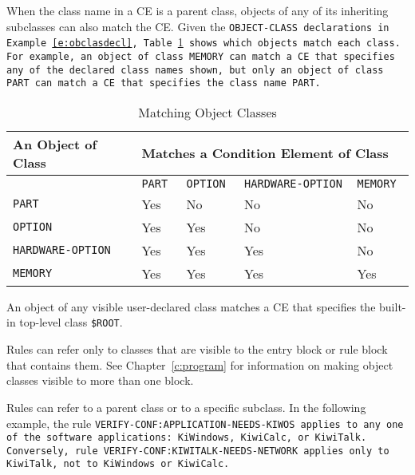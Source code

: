 When the class name in a CE is a parent class, objects of any of its
inheriting subclasses can also match the CE.  Given the
\tt{OBJECT-CLASS} declarations in Example~\ref{e:obclasdecl},
Table~\ref{t:matchingobclass} shows which objects match each
class. For example, an object of class \tt{MEMORY} can match a CE that
specifies any of the declared class names shown, but only an object of
class \tt{PART} can match a CE that specifies the class name
\tt{PART}.

\begin{table}[h]
  \centering
  \begin{tabular}{lllll}
    \toprule
    An Object of Class & \multicolumn{4}{l}{Matches a Condition Element of  Class} \\
    \midrule
    & \tt{PART} & \tt{OPTION} & \tt{HARDWARE-OPTION} & \tt{MEMORY} \\
    \midrule
    \tt{PART}               & Yes  & No     & No       & No  \\
    \tt{OPTION}             & Yes  & Yes    & No       & No  \\
    \tt{HARDWARE-OPTION}    & Yes  & Yes    & Yes      & No  \\
    \tt{MEMORY}             & Yes  & Yes    & Yes      & Yes  \\
    \bottomrule
  \end{tabular}
  \caption{Matching Object Classes}
  \label{t:matchingobclass}
\end{table}

An object of any visible user-declared class matches a CE that
specifies the built-in top-level class \verb|$ROOT|.

Rules can refer only to classes that are visible to the entry block or
rule block that contains them. See Chapter~\ref{c:program} for
information on making object classes visible to more than one block.

Rules can refer to a parent class or to a specific subclass. In
the following example, the rule
\tt{VERIFY-CONF:APPLICATION-NEEDS-KIWOS} applies to any one
of the software applications: \tt{KiWindows}, \tt{KiwiCalc}, or
\tt{KiwiTalk}. Conversely, rule
\tt{VERIFY-CONF:KIWITALK-NEEDS-NETWORK} applies only to
\tt{KiwiTalk}, not to \tt{KiWindows} or \tt{KiwiCalc}.

